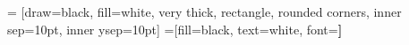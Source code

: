 \documentclass{article}
\begin{document}
\begin{multicols*}{3}
\hfuzz=5.002pt

 = [draw=black, fill=white, very thick,
    rectangle, rounded corners, inner sep=10pt, inner ysep=10pt]
 =[fill=black, text=white, font=\bfseries]

\normalsize

\end{multicols*}
\end{document}
